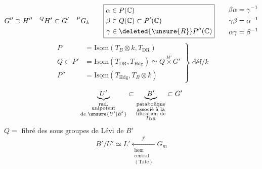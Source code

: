 \[
G''\supset H''\quad{}^{Q}H'\subset G'\quad{}^{P}G_k
\qquad
\boxed{\begin{aligned}
\alpha&\in P(\mathbb C)\\
\beta&\in Q(\mathbb C)\subset P'(\mathbb C)\\
\gamma&\in \deleted{\unsure{R}}P''(\mathbb C)
\end{aligned}}
\qquad
\begin{aligned}
\beta\alpha&=\gamma^{-1}\\
\gamma\beta&=\alpha^{-1}\\
\alpha\gamma&=\beta^{-1}
\end{aligned}
\]
\[
\left.\begin{aligned}
P&=\underline{\mathrm{Isom}}(T_B\otimes k,T_{\mathrm{DR}})\\
Q\subset P'&=\underline{\mathrm{Isom}}(T_{\mathrm{DR}},T_{\mathrm{Hdg}})\simeq Q\mathbin{\overset{H'}{\times}}G'\\
P''&=\underline{\mathrm{Isom}}(T_{\mathrm{Hdg}},T_B\otimes k)
\end{aligned}\right\}\text{ déf}/k
\]

\[
\underbrace{U'}_{\substack{\text{rad.}\\\text{unipotent}\\\text{de }\unsure{U'|B'}}}
\subset\underbrace{B'}_{\substack{\text{parabolique}\\\text{associé à la}\\\text{filtration de}\\T_{\mathrm{DR}}}}\subset G'
\]
$Q=$ fibré des sous groupes de Lévi de $B'$
\[
 B'/U'\simeq L'\xleftarrow[\substack{\text{hom}\\\text{central}\\(\mathrm{Tate})}]{j'}G_m
\]

